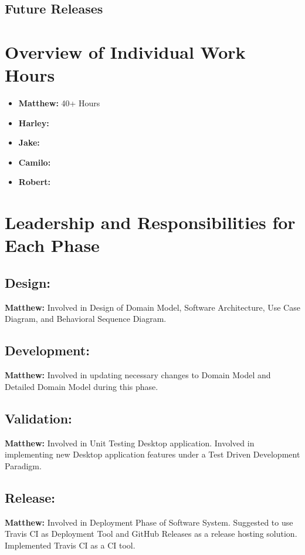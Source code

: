 \documentclass[12pt]{article}
\begin{document}
\subsection{Future Releases}

\section{Overview of Individual Work Hours}
\begin{itemize}
	\item \textbf{Matthew:} 40+ Hours
	\item \textbf{Harley:}
	\item \textbf{Jake:}
	\item \textbf{Camilo:}
	\item \textbf{Robert:}
\end{itemize}

\section{Leadership and Responsibilities for Each Phase}
\subsection{Design:}
\textbf{Matthew:} Involved in Design of Domain Model, Software Architecture, Use Case Diagram, and Behavioral Sequence Diagram. \\

\subsection{Development:}
\textbf{Matthew:} Involved in updating necessary changes to Domain Model and Detailed Domain Model during this phase.


\subsection{Validation:}
\textbf{Matthew:} Involved in Unit Testing Desktop application. Involved in implementing new Desktop application features under a Test Driven Development Paradigm.

\subsection{Release:}
\textbf{Matthew:} Involved in Deployment Phase of Software System. Suggested to use Travis CI as Deployment Tool and GitHub Releases as a release hosting solution. Implemented Travis CI as a CI tool.
\end{document}
